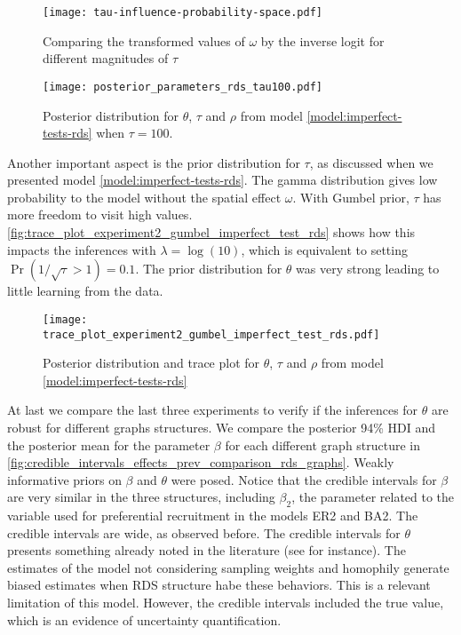 \begin{figure}
  \centering
  \caption{\label{fig:tau-influence-probability-space}Comparing
  the transformed values of $\omega$ by the inverse logit for different
  magnitudes of $\tau$}
  \texttt{[image: tau-influence-probability-space.pdf]}
\end{figure}

\begin{figure}
  \centering
  \caption{\label{fig:posterior_parameters_rds_tau100}Posterior distribution
  for $\theta$, $\tau$ and $\rho$ from model \eqref{model:imperfect-tests-rds}
  when $\tau = 100$.}
  \texttt{[image: posterior\_parameters\_rds\_tau100.pdf]}
\end{figure}

Another important aspect is the prior distribution for $\tau$, as discussed
when we presented model \eqref{model:imperfect-tests-rds}. The gamma
distribution gives low probability to the model without the spatial effect
$\omega$. With Gumbel prior, $\tau$ has more freedom to visit high values.
\autoref{fig:trace_plot_experiment2_gumbel_imperfect_test_rds} shows how this
impacts the inferences with $\lambda = \log(10)$, which is equivalent to setting
$\Pr(1/\sqrt{\tau} > 1) = 0.1$. The prior distribution for $\theta$ was very
strong leading to little learning from the data. 

\begin{figure}
  \centering
  \caption{\label{fig:trace_plot_experiment2_gumbel_imperfect_test_rds}Posterior
  distribution and trace plot for $\theta$, $\tau$ and $\rho$ from model 
  \eqref{model:imperfect-tests-rds}}
  \texttt{[image: trace\_plot\_experiment2\_gumbel\_imperfect\_test\_rds.pdf]}
\end{figure}

At last we compare the last three experiments to verify if the inferences for
$\theta$ are robust for different graphs structures. We compare the posterior
94\% HDI and the posterior mean for the parameter $\beta$ for each different
graph structure in
\autoref{fig:credible_intervals_effects_prev_comparison_rds_graphs}. Weakly
informative priors on $\beta$ and $\theta$ were posed. Notice that the
credible intervals for $\beta$ are very similar in the three structures,
including $\beta_2$, the parameter related to the variable used for
preferential recruitment in the models ER2 and BA2. The credible intervals are
wide, as observed before. The credible intervals for $\theta$ presents
something already noted in the literature (see \cite{gile2018methods} for
instance). The estimates of the model not considering sampling weights and
homophily generate biased estimates when RDS structure habe these behaviors.
This is a relevant limitation of this model. However, the credible intervals
included the true value, which is an evidence of uncertainty quantification.

